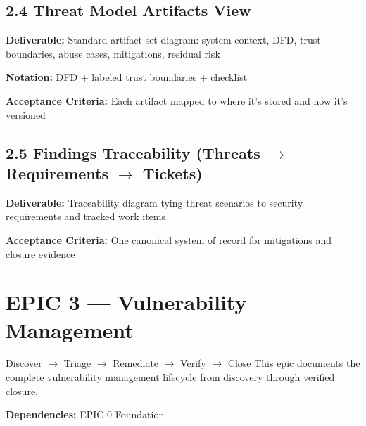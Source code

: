 \documentclass[11pt,letterpaper]{article}
\newcommand{\storyfield}[2]{\textbf{#1:} #2}
\begin{document}
\subsection{2.4 Threat Model Artifacts View}

\begin{storycard}
\storyfield{Deliverable}{Standard artifact set diagram: system context, DFD, trust boundaries, abuse cases, mitigations, residual risk}

\storyfield{Notation}{DFD + labeled trust boundaries + checklist}

\storyfield{Acceptance Criteria}{Each artifact mapped to where it's stored and how it's versioned}
\end{storycard}

\subsection{\texorpdfstring{2.5 Findings Traceability (Threats $\rightarrow$ Requirements $\rightarrow$ Tickets)}{2.5 Findings Traceability (Threats to Requirements to Tickets)}}

\begin{storycard}
\storyfield{Deliverable}{Traceability diagram tying threat scenarios to security requirements and tracked work items}

\storyfield{Acceptance Criteria}{One canonical system of record for mitigations and closure evidence}
\end{storycard}

\newpage

\section{EPIC 3 --- Vulnerability Management}

\begin{epicbox}{Discover $\rightarrow$ Triage $\rightarrow$ Remediate $\rightarrow$ Verify $\rightarrow$ Close}
This epic documents the complete vulnerability management lifecycle from discovery through verified closure.

\textbf{Dependencies:} EPIC 0 Foundation
\end{epicbox}

\end{document}
